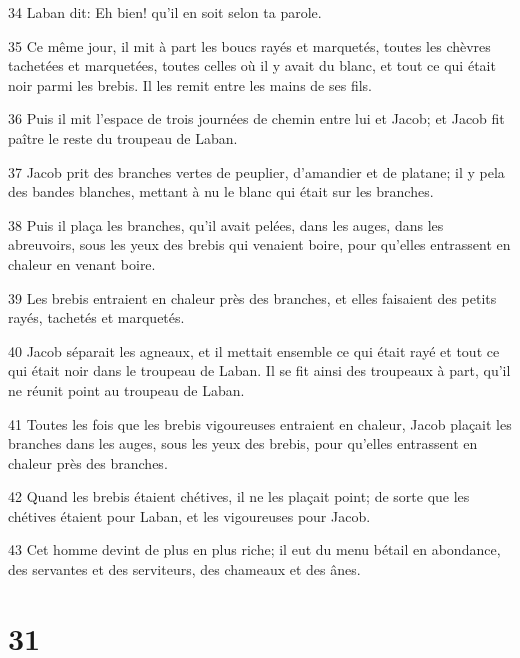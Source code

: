 \par 34 Laban dit: Eh bien! qu'il en soit selon ta parole.
\par 35 Ce même jour, il mit à part les boucs rayés et marquetés, toutes les chèvres tachetées et marquetées, toutes celles où il y avait du blanc, et tout ce qui était noir parmi les brebis. Il les remit entre les mains de ses fils.
\par 36 Puis il mit l'espace de trois journées de chemin entre lui et Jacob; et Jacob fit paître le reste du troupeau de Laban.
\par 37 Jacob prit des branches vertes de peuplier, d'amandier et de platane; il y pela des bandes blanches, mettant à nu le blanc qui était sur les branches.
\par 38 Puis il plaça les branches, qu'il avait pelées, dans les auges, dans les abreuvoirs, sous les yeux des brebis qui venaient boire, pour qu'elles entrassent en chaleur en venant boire.
\par 39 Les brebis entraient en chaleur près des branches, et elles faisaient des petits rayés, tachetés et marquetés.
\par 40 Jacob séparait les agneaux, et il mettait ensemble ce qui était rayé et tout ce qui était noir dans le troupeau de Laban. Il se fit ainsi des troupeaux à part, qu'il ne réunit point au troupeau de Laban.
\par 41 Toutes les fois que les brebis vigoureuses entraient en chaleur, Jacob plaçait les branches dans les auges, sous les yeux des brebis, pour qu'elles entrassent en chaleur près des branches.
\par 42 Quand les brebis étaient chétives, il ne les plaçait point; de sorte que les chétives étaient pour Laban, et les vigoureuses pour Jacob.
\par 43 Cet homme devint de plus en plus riche; il eut du menu bétail en abondance, des servantes et des serviteurs, des chameaux et des ânes.

\chapter{31}

